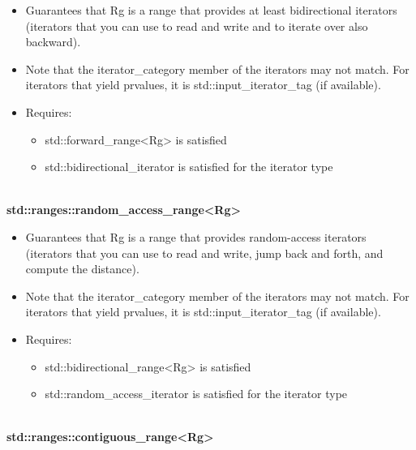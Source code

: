 \begin{itemize}
\item
Guarantees that Rg is a range that provides at least bidirectional iterators (iterators that you can use to read and write and to iterate over also backward).

\item
Note that the iterator\_category member of the iterators may not match. For iterators that yield prvalues, it is std::input\_iterator\_tag (if available).

\item
Requires:

\begin{itemize}
\item
std::forward\_range<Rg> is satisfied

\item
std::bidirectional\_iterator is satisfied for the iterator type
\end{itemize}
\end{itemize}

\noindent
\hspace*{\fill} \\ %
\textbf{std::ranges::random\_access\_range<Rg>}

\begin{itemize}
\item
Guarantees that Rg is a range that provides random-access iterators (iterators that you can use to read and write, jump back and forth, and compute the distance).

\item
Note that the iterator\_category member of the iterators may not match. For iterators that yield prvalues, it is std::input\_iterator\_tag (if available).

\item
Requires:

\begin{itemize}
\item
std::bidirectional\_range<Rg> is satisfied

\item
std::random\_access\_iterator is satisfied for the iterator type
\end{itemize}
\end{itemize}

\noindent
\hspace*{\fill} \\ %
\textbf{std::ranges::contiguous\_range<Rg>}

